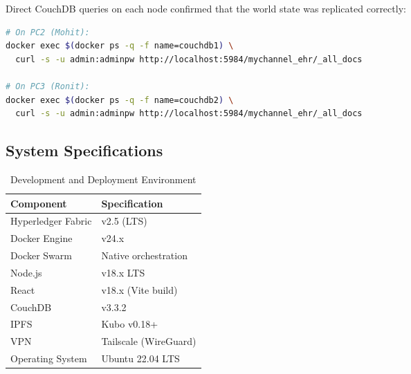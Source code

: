 Direct CouchDB queries on each node confirmed that the world state was replicated correctly:

\begin{lstlisting}[language=bash, caption={CouchDB State Query on Worker Nodes}]
# On PC2 (Mohit):
docker exec $(docker ps -q -f name=couchdb1) \
  curl -s -u admin:adminpw http://localhost:5984/mychannel_ehr/_all_docs

# On PC3 (Ronit):
docker exec $(docker ps -q -f name=couchdb2) \
  curl -s -u admin:adminpw http://localhost:5984/mychannel_ehr/_all_docs
\end{lstlisting}


\subsection{System Specifications}

\begin{table}[h]
\centering
\caption{Development and Deployment Environment}
\label{tab:system_specs}
\begin{tabular}{|l|l|}
\hline
\textbf{Component} & \textbf{Specification} \\
\hline
Hyperledger Fabric & v2.5 (LTS) \\
\hline
Docker Engine & v24.x \\
\hline
Docker Swarm & Native orchestration \\
\hline
Node.js & v18.x LTS \\
\hline
React & v18.x (Vite build) \\
\hline
CouchDB & v3.3.2 \\
\hline
IPFS & Kubo v0.18+ \\
\hline
VPN & Tailscale (WireGuard) \\
\hline
Operating System & Ubuntu 22.04 LTS \\
\hline
\end{tabular}
\end{table}
